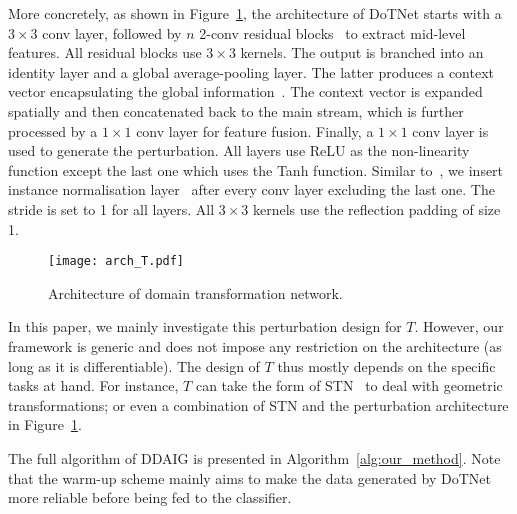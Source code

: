 \documentclass[letterpaper]{article}
\begin{document}
More concretely, as shown in Figure~\ref{fig:arch_T}, the architecture of DoTNet starts with a $3 \times 3$ conv layer, followed by $n$ 2-conv residual blocks~\cite{he2016deep} to extract mid-level features. All residual blocks use $3 \times 3$ kernels. The output is branched into an identity layer and a global average-pooling layer. The latter produces a context vector encapsulating the global information~\cite{liu2016parsenet}. The context vector is expanded spatially and then concatenated back to the main stream, which is further processed by a $1 \times 1$ conv layer for feature fusion. Finally, a $1 \times 1$ conv layer is used to generate the perturbation. All layers use ReLU as the non-linearity function except the last one which uses the Tanh function. Similar to~\cite{zhu2017unpaired}, we insert instance normalisation layer~\cite{Ulyanov_2017_CVPR} after every conv layer excluding the last one. The stride is set to 1 for all layers. All $3 \times 3$ kernels use the reflection padding of size 1.

\begin{figure}[t]
    \centering
    \texttt{[image: arch\_T.pdf]}
    \caption{\small Architecture of domain transformation network.}
    \label{fig:arch_T}
    \vspace{-0.4cm}
\end{figure}

In this paper, we mainly investigate this perturbation design for $T$. However, our framework is generic and does not impose any restriction on the architecture  (as long as it is differentiable). The design of $T$ thus mostly depends on the specific tasks at hand.
For instance, $T$ can take the form of STN~\cite{nips15stn} to deal with geometric transformations; or even a combination of STN and the perturbation architecture in  Figure~\ref{fig:arch_T}.

The full algorithm of DDAIG is presented in Algorithm~\ref{alg:our_method}. Note that the warm-up scheme mainly aims to make the data generated by DoTNet more reliable before being fed to the classifier.
\end{document}
